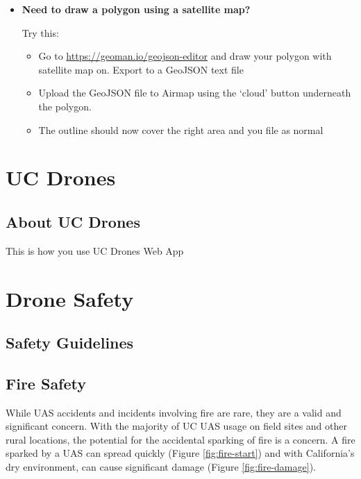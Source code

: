 \documentclass[
]{book}
\providecommand{\tightlist}{%
  \setlength{\itemsep}{0pt}\setlength{\parskip}{0pt}}
\begin{document}
\begin{itemize}
\item
  \textbf{Need to draw a polygon using a satellite map?}

  Try this:

  \begin{itemize}
  \tightlist
  \item
    Go to \url{https://geoman.io/geojson-editor} and draw your polygon with satellite map on. Export to a GeoJSON text file
  \item
    Upload the GeoJSON file to Airmap using the `cloud' button underneath the polygon.
  \item
    The outline should now cover the right area and you file as normal
  \end{itemize}
\end{itemize}

\hypertarget{part-uc-drones}{%
\part{UC Drones}\label{part-uc-drones}}

\hypertarget{ch-about-UCdrones}{%
\chapter{About UC Drones}\label{ch-about-UCdrones}}

This is how you use UC Drones Web App

\hypertarget{part-drone-safety}{%
\part{Drone Safety}\label{part-drone-safety}}

\hypertarget{ch-safety-guidelines}{%
\chapter{Safety Guidelines}\label{ch-safety-guidelines}}

\hypertarget{ch-fire-safety}{%
\chapter{Fire Safety}\label{ch-fire-safety}}

While UAS accidents and incidents involving fire are rare, they are a valid and significant concern. With the majority of UC UAS usage on field sites and other rural locations, the potential for the accidental sparking of fire is a concern. A fire sparked by a UAS can spread quickly (Figure \ref{fig:fire-start}) and with California's dry environment, can cause significant damage (Figure \ref{fig:fire-damage}).
\end{document}
